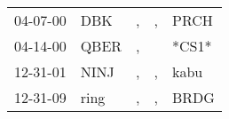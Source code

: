 \begin{supertabular}{lllll}
 04-07-00 &   DBK &  , &  , &   PRCH \\
 04-14-00 &  QBER &  , &    &  *CS1* \\
 12-31-01 &  NINJ &  , &  , &   kabu \\
 12-31-09 &  ring &  , &  , &   BRDG \\
\end{supertabular}
